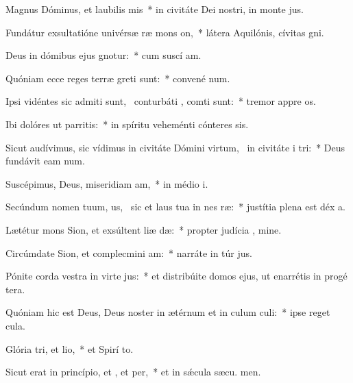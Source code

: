 \item Magnus Dóminus, et laubilis mis~* in civitáte Dei nostri, in monte  jus.
\item Fundátur exsultatióne univérsæ ræ mons on,~* látera Aquilónis, cívitas  gni.
\item Deus in dómibus ejus gnotur:~* cum suscí am.
\item Quóniam ecce reges terræ greti sunt:~* convené  num.
\item Ipsi vidéntes sic admiti sunt,~\pscross{} conturbáti , comti sunt:~* tremor appre os.
\item Ibi dolóres ut parritis:~* in spíritu veheménti cónteres  sis.
\item Sicut audívimus, sic vídimus in civitáte Dómini virtum,~\pscross{} in civitáte i tri:~* Deus fundávit eam  num.
\item Suscépimus, Deus, miseridiam am,~* in médio  i.
\item Secúndum nomen tuum, us,~\pscross{} sic et laus tua in nes ræ:~* justítia plena est déx a.
\item Lætétur mons Sion, et exsúltent liæ dæ:~* propter judícia , mine.
\item Circúmdate Sion, et complecmini am:~* narráte in túr jus.
\item Pónite corda vestra in virte jus:~* et distribúite domos ejus, ut enarrétis in progé tera.
\item Quóniam hic est Deus, Deus noster in ætérnum et in culum culi:~* ipse reget   cula.
\item Glória tri, et lio,~* et Spirí to.
\item Sicut erat in princípio, et , et per,~* et in sǽcula sæcu. men.
